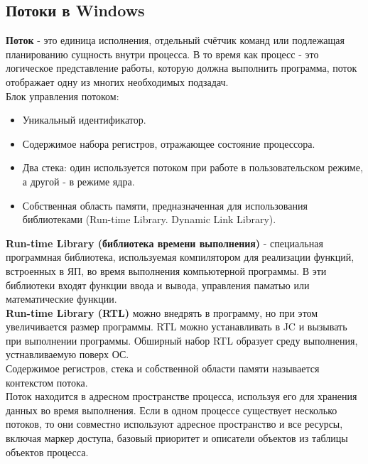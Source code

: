 \documentclass[a4paper]{article}
\begin{document}
\subsection{Потоки в Windows}
\textbf{Поток} - это единица исполнения, отдельный счётчик команд или подлежащая планированию сущность внутри процесса. В то время как процесс - это логическое представление работы, которую должна выполнить программа, поток отображает одну из многих необходимых подзадач.\\
Блок управления потоком:
\begin{itemize}
        \item Уникальный идентификатор.
	\item Содержимое набора регистров, отражающее состояние процессора.
	\item Два стека: один используется потоком при работе в пользовательском режиме, а другой - в режиме ядра.
	\item Собственная область памяти, предназначенная для использования библиотеками (Run-time Library. Dynamic Link Library).
\end{itemize}
\textbf{Run-time Library (библиотека времени выполнения)} - специальная программная библиотека, используемая компилятором для реализации функций, встроенных в ЯП, во время выполнения компьютерной программы. В эти библиотеки входят функции ввода и вывода, управления паматью или математические функции.\\
\textbf{Run-time Library (RTL)} можно внедрять в программу, но при этом увеличивается размер программы. RTL можно устанавливать в JC и вызывать при выполнении программы. Обширный набор RTL образует среду выполнения, устнавливаемую поверх ОС.\\
Содержимое регистров, стека и собственной области памяти называется контекстом потока.\\
Поток находится в адресном пространстве процесса, используя его для хранения данных во время выполнения. Если в одном процессе существует несколько потоков, то они совместно используют адресное пространство и все ресурсы, включая маркер доступа, базовый приоритет и описатели объектов из таблицы объектов процесса.
\end{document}

